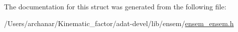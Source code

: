 The documentation for this struct was generated from the following file\+:\begin{DoxyCompactItemize}
\item 
/\+Users/archanar/\+Kinematic\+\_\+factor/adat-\/devel/lib/ensem/\mbox{\hyperlink{adat-devel_2lib_2ensem_2ensem__ensem_8h}{ensem\+\_\+ensem.\+h}}\end{DoxyCompactItemize}
